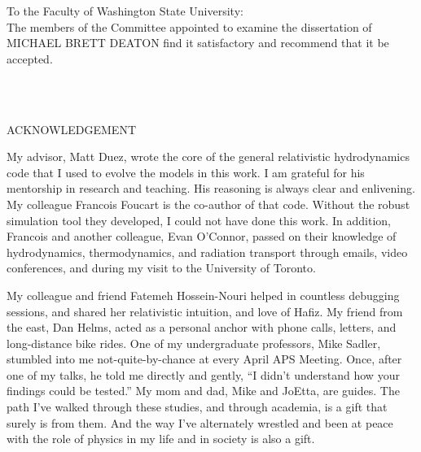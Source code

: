 \documentclass[12pt]{report}
\begin{document}
\begin{singlespace}
  \noindent
  \vspace{1.5in}

  \noindent To the Faculty of Washington State University:\\
  
  The members of the Committee appointed to examine the dissertation of
  \uppercase{Michael Brett Deaton}
  find it satisfactory and recommend that it be accepted.
  
  \begin{flushright}
    \\
    \\
  \end{flushright}
\end{singlespace}
\newpage

\begin{center}
  \uppercase{Acknowledgement}
\end{center}

  \bigskip
  My advisor, Matt Duez, wrote the core of the general relativistic hydrodynamics
  code that I used to evolve the models in this work. I am grateful for his
  mentorship in research and teaching. His reasoning is always clear and
  enlivening. My colleague Francois Foucart is the co-author of that code.
  Without the robust simulation tool they developed, I could not have done this
  work. In addition, Francois and another colleague, Evan O'Connor, passed on
  their knowledge of hydrodynamics, thermodynamics, and radiation transport
  through emails, video conferences, and during my visit to the University of
  Toronto.

  My colleague and friend Fatemeh Hossein-Nouri helped in countless debugging
  sessions, and shared her relativistic intuition, and love of Hafiz.
  My friend from the east, Dan Helms, acted as a personal anchor with phone
  calls, letters, and long-distance bike rides.
  One of my undergraduate professors, Mike Sadler, stumbled into me
  not-quite-by-chance at every April APS Meeting. Once, after one of my talks,
  he told me directly and gently, ``I didn't understand how your findings could
  be tested.''
  My mom and dad, Mike and JoEtta, are guides. The path I've walked through
  these studies, and through academia, is a gift that surely is from them.
  And the way I've alternately wrestled and been at peace with the role of
  physics in my life and in society is also a gift.
\end{document}
